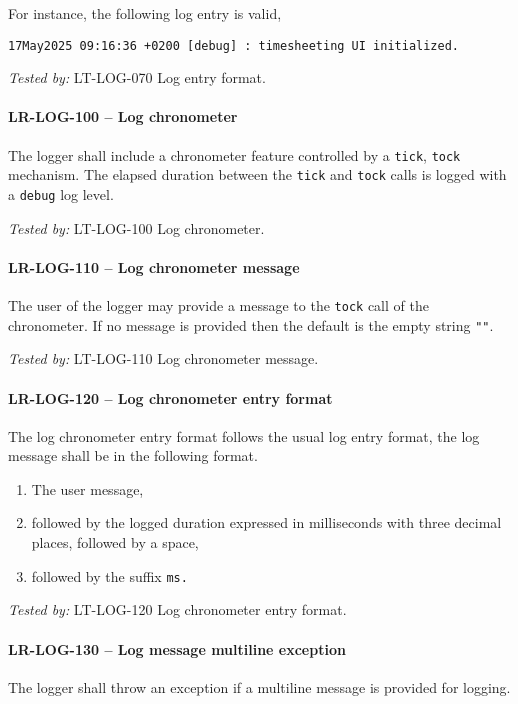 For instance, the following log entry is valid,
\begin{lstlisting}[numbers=none]
17May2025 09:16:36 +0200 [debug] : timesheeting UI initialized.
\end{lstlisting}

\textit{Tested by: } LT-LOG-070 Log entry format.

\paragraph{LR-LOG-100 -- Log chronometer}
The logger shall include a chronometer feature controlled by
a \lstinline{tick}, \lstinline{tock} mechanism.
The elapsed duration between the \lstinline{tick} and \lstinline{tock}
calls is logged with a \lstinline{debug} log level.

\textit{Tested by: } LT-LOG-100 Log chronometer.

\paragraph{LR-LOG-110 -- Log chronometer message}
The user of the logger may provide a message to the \lstinline{tock}
call of the chronometer. If no message is provided then the default
is the empty string \lstinline{""}.

\textit{Tested by: } LT-LOG-110 Log chronometer message.

\paragraph{LR-LOG-120 -- Log chronometer entry format}
The log chronometer entry format follows the usual log entry format,
the log message shall be in the following format.
\begin{enumerate}
\item The user message,
\item followed by the logged duration expressed in milliseconds
  with three decimal places, followed by a space,
\item followed by the suffix \lstinline{ms.}
\end{enumerate}

\textit{Tested by: } LT-LOG-120 Log chronometer entry format.

\paragraph{LR-LOG-130 -- Log message multiline exception}
The logger shall throw an exception if a multiline message is provided
for logging.

